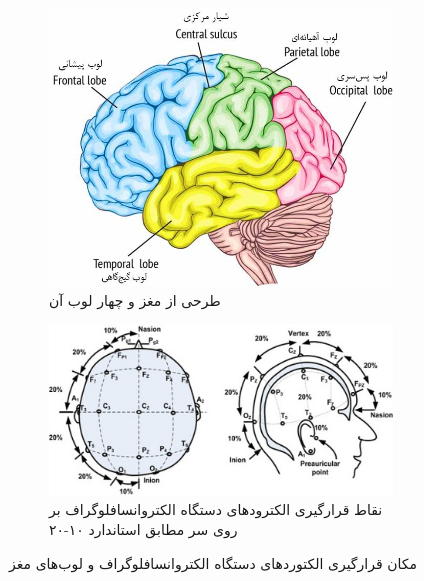 \begin{figure}[htbp]
	\centering
	\begin{subfigure}{\textwidth}
		\centering
		\includegraphics[width=.7\linewidth]{figures/brain_lobes}
		\caption{طرحی از مغز و چهار لوب آن}
		\label{fig:brainlobes}
	\end{subfigure}
	\begin{subfigure}{\textwidth}
		\centering
		\includegraphics[width=\linewidth]{figures/EEG_10-20}
		\caption{نقاط قرارگیری الکترود‌های دستگاه الکتروانسافلوگراف بر روی سر مطابق استاندارد ۱۰-۲۰}
		\label{fig:eeg10-20}
	\end{subfigure}
	\caption[لوب‌های مغز و استاندارد ۱۰-۲۰]{مکان قرارگیری الکتوردهای دستگاه الکتروانسافلوگراف و لوب‌های مغز}
	\label{fig:LOB_1020}
\end{figure}

